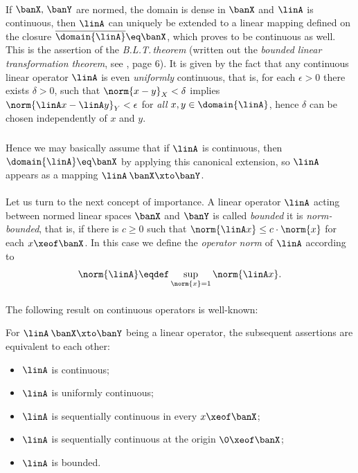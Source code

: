 \documentclass[11pt,twoside]{article}
\begin{document}
\paragraph{} %
If $\banX,\,\banY$ are normed,
the domain is dense in $\banX$ and $\linA$ is continuous,
then $\linA$ can uniquely be extended to a linear mapping
defined on the closure $\overline{\domain{\linA}} \eq \banX$,
which proves to be continuous as well.
This is the assertion of the \textit{B.L.T.\,theorem}
(written out the \textit{bounded linear transformation theorem},
see \cite{II_RS1}, page 6).
It is given by the fact that
any continuous linear operator $\linA$ is even \textit{uniformly} continuous,
that is,
for each $\epsilon > 0$ there exists $\delta > 0$,
such that
$\norm{x-y}_X < \delta$ implies $\norm{\linA x - \linA y}_Y < \epsilon$
for \textit{all} $x,y \in \domain{\linA}$,
hence $\delta$ can be chosen independently of $x$ and $y$.

\subparagraph{}
Hence we may basically assume
that if $\linA$ is continuous,
then $\domain{\linA} \eq \banX$ by applying this canonical extension,
so $\linA$ appears as a mapping $\linA\:\banX \xto \banY$.

\paragraph{} %
Let us turn to the next concept of importance.
A linear operator $\linA$
acting between normed linear spaces $\banX$ and $\banY$
is called \textit{bounded}
\iff it is \textit{norm-bounded},
that is,
if there is $c \geq 0$
such that $\norm{\linA x} \leq c \cdot \norm{x}$ for each $x \xeof \banX$.
In this case we define the \textit{operator norm} of $\linA$ according to
\begin{equation}\label{II_OPERATOR_NORM}
\norm{\linA} \eqdef \sup_{\norm{x}=1} \norm{\linA x}.
\end{equation}

\paragraph{}
The following result on continuous operators is well-known:

\begin{theorem1}\label{II_MAIN_THEOREM_ON_CONTINUOUS_OPERATORS}
For $\linA\:\banX \xto \banY$ being a linear operator,
the subsequent assertions are equivalent to each other:

\begin{itemize}[leftmargin=9mm]
\item[(a)] $\linA$ is continuous;
\item[(b)] $\linA$ is uniformly continuous;
\item[(c)] $\linA$ is sequentially continuous in every $x \xeof \banX$;
\item[(d)] $\linA$ is sequentially continuous at the origin $\0 \xeof \banX$;
\item[(e)] $\linA$ is bounded.
\end{itemize}
\end{theorem1}
\end{document}
